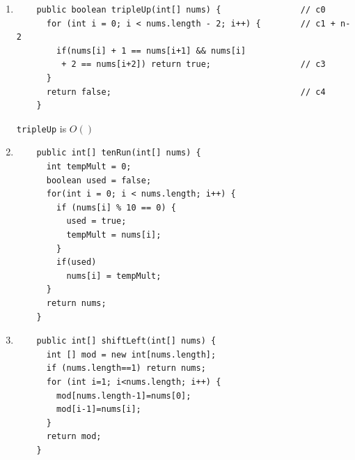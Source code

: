 \documentclass[a4paper,12pt]{article}
\begin{document}
\begin{enumerate}
    \item \begin{Verbatim}
    public boolean tripleUp(int[] nums) {                // c0
      for (int i = 0; i < nums.length - 2; i++) {        // c1 + n-2
        if(nums[i] + 1 == nums[i+1] && nums[i]
         + 2 == nums[i+2]) return true;                  // c3
      }
      return false;                                      // c4
    }
    \end{Verbatim}
    \texttt{tripleUp} is $O()$

    \item \begin{Verbatim}
    public int[] tenRun(int[] nums) {
      int tempMult = 0;
      boolean used = false;
      for(int i = 0; i < nums.length; i++) {
        if (nums[i] % 10 == 0) {
          used = true;
          tempMult = nums[i];
        }
        if(used)
          nums[i] = tempMult;
      }
      return nums;
    }
    \end{Verbatim}

    \item \begin{Verbatim}
    public int[] shiftLeft(int[] nums) {
      int [] mod = new int[nums.length];
      if (nums.length==1) return nums;
      for (int i=1; i<nums.length; i++) {
        mod[nums.length-1]=nums[0];
        mod[i-1]=nums[i];
      }
      return mod;
    }
    \end{Verbatim}
    \end{enumerate}
\end{document}
